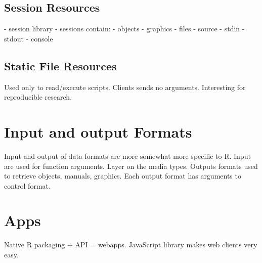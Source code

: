 \documentclass{article}
\begin{document}
\subsection{Session Resources}

 - session library
 - sessions contain:
   - objects
   - graphics
   - files
   - source
   - stdin
   - stdout
   - console

\subsection{Static File Resources}

Used only to read/execute scripts.
Clients sends no arguments.
Interesting for reproducible research.


\section{Input and output Formats}

Input and output of data formats are more somewhat more specific to R.
Input are used for function arguments. Layer on the media types.
Outputs formats used to retrieve objects, manuals, graphics.
Each output format has arguments to control format.

\section{Apps}

Native R packaging + API = webapps.
JavaScript library makes web clients very easy.





\end{document}
